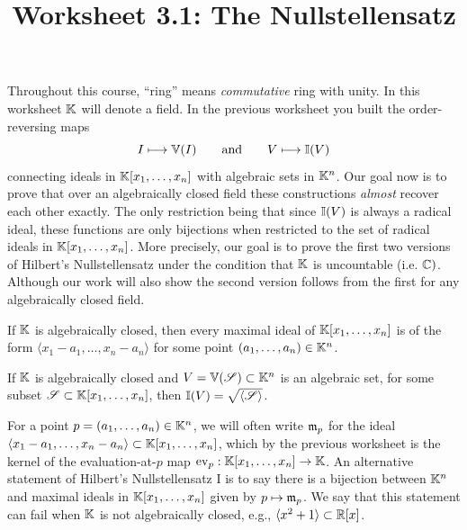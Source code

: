 \documentclass[12pt,reqno]{amsart}
\title{Worksheet 3.1: The Nullstellensatz}
\begin{document}

\maketitle
\thispagestyle{firstpage}

Throughout this course, ``ring'' means \textit{commutative} ring with unity. In this worksheet $\mathbb{K}$ will denote a field. In the previous worksheet you built the order-reversing maps
\[
I \longmapsto \mathbb{V}(I)
\qquad\text{and}\qquad
V \longmapsto \mathbb{I}(V)
\]
connecting ideals in $\mathbb{K}[x_1,\ldots,x_n]$ with algebraic sets in $\mathbb{K}^n$. Our goal now is to prove that over an algebraically closed field these constructions \emph{almost} recover each other exactly. The only restriction being that since $\mathbb{I}(V)$ is always a radical ideal, these functions are only bijections when restricted to the set of radical ideals in $\mathbb{K}[x_1,\ldots,x_n]$. More precisely, our goal is to prove the first two versions of  Hilbert's Nullstellensatz under the condition that $\mathbb{K}$ is uncountable (i.e. $\mathbb{C})$. Although our work will also show the second version follows from the first for any algebraically closed field. 

\begin{theorem} If $\mathbb{K}$ is algebraically closed, then every maximal ideal of $\mathbb{K}[x_1,\ldots,x_n]$ is of the form $\langle x_1-a_1,\ldots,x_n-a_n\rangle$ for some point $(a_1,\ldots,a_n) \in \mathbb{K}^n$.
\end{theorem}  

 \begin{theorem} If $\mathbb{K}$ is algebraically closed and $V = \mathbb{V}(\mathcal{S}) \subset \mathbb{K}^n$ is an algebraic set, for some subset $\mathcal{S} \subset \mathbb{K}[x_1,\ldots,x_n]$, then $\mathbb{I}(V) = \sqrt{\langle \mathcal{S} \rangle}$. 
\end{theorem}  

For a point $p=(a_1,\ldots,a_n)\in \mathbb{K}^n$, we will often write $\mathfrak{m}_p$ for the ideal $\langle x_1-a_1,\ldots,x_n-a_n\rangle \subset \mathbb{K}[x_1,\ldots,x_n]$, which by the previous worksheet is the kernel of the evaluation-at-$p$ map $\operatorname{ev}_{p}:\mathbb{K}[x_1,\ldots,x_{n}] \to \mathbb{K}$.  An alternative statement of Hilbert's Nullstellensatz I is to say there is a bijection between $\mathbb{K}^n$ and maximal ideals in $\mathbb{K}[x_1,\ldots,x_n]$ given by $p\mapsto \mathfrak{m}_p$. We say that this statement can fail when $\mathbb{K}$ is not algebraically closed, e.g., $\langle x^2+1 \rangle \subset \mathbb{R}[x]$. 
\end{document}
